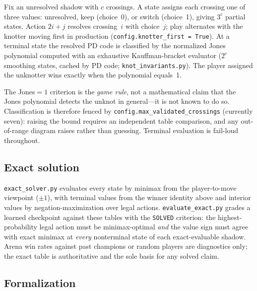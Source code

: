 Fix an unresolved shadow with $c$ crossings. A state assigns each crossing one
of three values: unresolved, keep (choice~0), or switch (choice~1), giving
$3^c$ partial states. Action $2i+j$ resolves crossing~$i$ with choice~$j$; play
alternates with the knotter moving first in production
(\texttt{config.knotter\_first = True}). At a terminal state the resolved PD
code is classified by the normalized Jones polynomial computed with an
exhaustive Kauffman-bracket evaluator ($2^c$ smoothing states, cached by PD
code; \texttt{knot\_invariants.py}). The player assigned the unknotter wins
exactly when the polynomial equals~1.

The Jones$=1$ criterion is the \emph{game rule}, not a mathematical claim that
the Jones polynomial detects the unknot in general---it is not known to do so.
Classification is therefore fenced by \texttt{config.max\_validated\_crossings}
(currently seven): raising the bound requires an independent table comparison,
and any out-of-range diagram raises rather than guessing. Terminal evaluation
is fail-loud throughout.

\subsection{Exact solution}
\label{sec:exact}

\texttt{exact\_solver.py} evaluates every state by minimax from the
player-to-move viewpoint ($\pm 1$), with terminal values from the winner
identity above and interior values by negation-maximization over legal actions.
\texttt{evaluate\_exact.py} grades a learned checkpoint against these tables
with the \texttt{SOLVED} criterion: the highest-probability legal action must
be minimax-optimal \emph{and} the value sign must agree with exact minimax at
\emph{every} nonterminal state of each exact-evaluable shadow. Arena win rates
against past champions or random players are diagnostics only; the exact table
is authoritative and the sole basis for any solved claim.

\subsection{Formalization}
\label{sec:lean}

